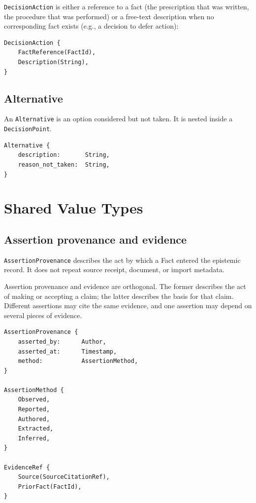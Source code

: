 \documentclass[11pt]{article}
\begin{document}
\texttt{DecisionAction} is either a reference to a fact (the prescription
that was written, the procedure that was performed) or a free-text
description when no corresponding fact exists (e.g., a decision to defer
action):

\begin{lstlisting}
DecisionAction {
    FactReference(FactId),
    Description(String),
}
\end{lstlisting}

\subsection{Alternative}

An \texttt{Alternative} is an option considered but not taken. It is nested
inside a \texttt{DecisionPoint}.

\begin{lstlisting}
Alternative {
    description:       String,
    reason_not_taken:  String,
}
\end{lstlisting}

\section{Shared Value Types}
\label{sec:value-types}

\subsection{Assertion provenance and evidence}

\texttt{AssertionProvenance} describes the act by which a Fact entered the
epistemic record. It does not repeat source receipt, document, or import
metadata.

Assertion provenance and evidence are orthogonal. The former describes the
act of making or accepting a claim; the latter describes the basis for that
claim. Different assertions may cite the same evidence, and one assertion may
depend on several pieces of evidence.

\begin{lstlisting}
AssertionProvenance {
    asserted_by:      Author,
    asserted_at:      Timestamp,
    method:           AssertionMethod,
}

AssertionMethod {
    Observed,
    Reported,
    Authored,
    Extracted,
    Inferred,
}

EvidenceRef {
    Source(SourceCitationRef),
    PriorFact(FactId),
}
\end{lstlisting}
\end{document}
